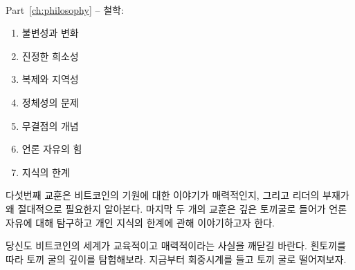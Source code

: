 ~

\begin{samepage}
	Part~\ref{ch:philosophy} -- 철학:
	
	\begin{enumerate}
		\item 불변성과 변화
		\item 진정한 희소성
		\item 복제와 지역성
		\item 정체성의 문제
		\item 무결점의 개념
		\item 언론 자유의 힘
		\item 지식의 한계
	\end{enumerate}
\end{samepage}

다섯번째 교훈은 비트코인의 기원에 대한 이야기가 매력적인지, 그리고 리더의 부재가 왜 절대적으로 필요한지
알아본다. 마지막 두 개의 교훈은 깊은 토끼굴로 들어가 언론 자유에 대해 탐구하고 개인 지식의 한계에 관해 이야기하고자 한다. 

당신도 비트코인의 세계가 교육적이고 매력적이라는 사실을 깨닫길 바란다. 흰토끼를 따라 토끼 굴의 깊이를 탐험해보라.
지금부터 회중시계를 들고 토끼 굴로 떨어져보자.

